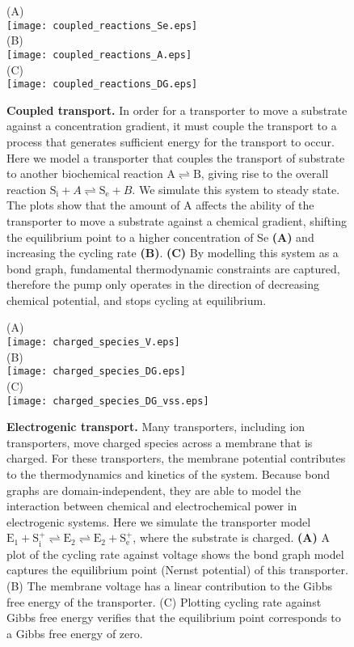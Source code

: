 \documentclass[11pt]{article}
\begin{document}
\begin{figure}
	\centering
	(A)\\
	\texttt{[image: coupled\_reactions\_Se.eps]}\\
	(B)\\
	\texttt{[image: coupled\_reactions\_A.eps]}\\
	(C)\\
	\texttt{[image: coupled\_reactions\_DG.eps]}
	\caption{\textbf{Coupled transport.} In order for a transporter to move a substrate against a concentration gradient, it must couple the transport to a process that generates sufficient energy for the transport to occur. Here we model a transporter that couples the transport of substrate to another biochemical reaction $\mathrm{A \rightleftharpoons B}$, giving rise to the overall reaction $	\mathrm{S_i} + A \rightleftharpoons \mathrm{S_e} + B$. We simulate this system to steady state. The plots show that the amount of A affects the ability of the transporter to move a substrate against a chemical gradient, shifting the equilibrium point to a higher concentration of Se \textbf{(A)} and increasing the cycling rate \textbf{(B)}. \textbf{(C)} By modelling this system as a bond graph, fundamental thermodynamic constraints are captured, therefore the pump only operates in the direction of decreasing chemical potential, and stops cycling at equilibrium.}
\end{figure}

\begin{figure}
	\centering
	(A)\\
	\texttt{[image: charged\_species\_V.eps]}\\
	(B)\\
	\texttt{[image: charged\_species\_DG.eps]} \\
	(C)\\
	\texttt{[image: charged\_species\_DG\_vss.eps]}
	\caption{\textbf{Electrogenic transport.} Many transporters, including ion transporters, move charged species across a membrane that is charged. For these transporters, the membrane potential contributes to the thermodynamics and kinetics of the system. Because bond graphs are domain-independent, they are able to model the interaction between chemical and electrochemical power in electrogenic systems. Here we simulate the transporter model $\mathrm{E_1 + S_i^+ \rightleftharpoons E_2 \rightleftharpoons E_2 + S_e^+}$, where the substrate is charged. \textbf{(A)} A plot of the cycling rate against voltage shows the bond graph model captures the equilibrium point (Nernst potential) of this transporter. (B) The membrane voltage has a linear contribution to the Gibbs free energy of the transporter. (C) Plotting cycling rate against Gibbs free energy verifies that the equilibrium point corresponds to a Gibbs free energy of zero.}
\end{figure}
\end{document}
